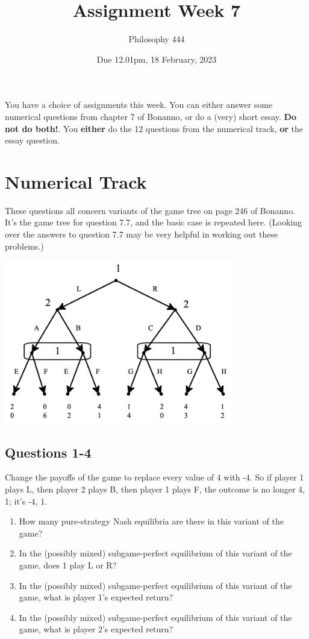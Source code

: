 \documentclass[
  11pt,
]{article}
\title{Assignment Week 7}
\author{Philosophy 444}
\date{Due 12.01pm, 18 February, 2023}
\providecommand{\tightlist}{%
  \setlength{\itemsep}{0pt}\setlength{\parskip}{0pt}}
\begin{document}
\maketitle


You have a choice of assignments this week. You can either answer some
numerical questions from chapter 7 of Bonanno, or do a (very) short
essay. \textbf{Do not do both!}. You \textbf{either} do the 12 questions
from the numerical track, \textbf{or} the essay question.

\hypertarget{numerical-track}{%
\section{Numerical Track}\label{numerical-track}}

These questions all concern variants of the game tree on page 246 of
Bonanno. It's the game tree for question 7.7, and the basic case is
repeated here. (Looking over the answers to question 7.7 may be very
helpful in working out these problems.)

\includegraphics[width=0.75\textwidth,height=\textheight]{bonanno-tree.png}

\hypertarget{questions-1-4}{%
\subsection{Questions 1-4}\label{questions-1-4}}

Change the payoffs of the game to replace every value of 4 with -4. So
if player 1 plays L, then player 2 plays B, then player 1 plays F, the
outcome is no longer 4, 1; it's -4, 1.

\begin{enumerate}
\def\labelenumi{\arabic{enumi}.}
\tightlist
\item
  How many pure-strategy Nash equilibria are there in this variant of
  the game?
\item
  In the (possibly mixed) subgame-perfect equilibrium of this variant of
  the game, does 1 play L or R?
\item
  In the (possibly mixed) subgame-perfect equilibrium of this variant of
  the game, what is player 1's expected return?
\item
  In the (possibly mixed) subgame-perfect equilibrium of this variant of
  the game, what is player 2's expected return?
\end{enumerate}
\end{document}
